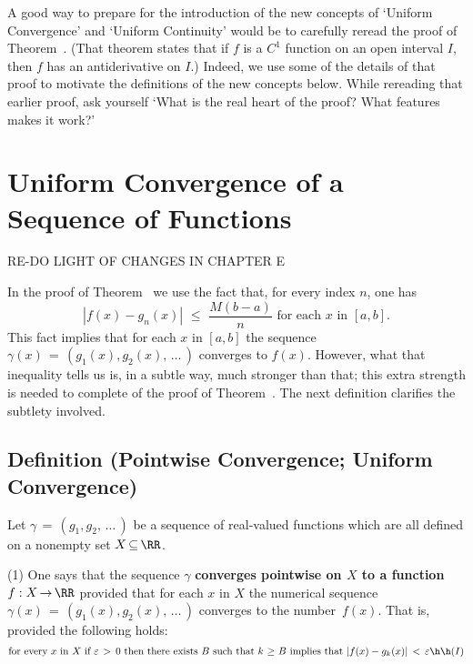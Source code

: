     A good way to prepare for the introduction of the new concepts of `Uniform Convergence' and `Uniform Continuity'
    would be to carefully reread the proof of Theorem~.
    (That theorem states that if $f$ is a $C^{1}$ function on an open interval $I$, then $f$ has an antiderivative on $I$.)
    Indeed, we use some of the details of that proof to motivate the definitions of the new concepts below.
    While rereading that earlier proof, ask yourself `What is the real heart of the proof? What features makes it work?'

\V
\V

                \section{{\bf Uniform Convergence of a Sequence of Functions}}
                \label{SectF05}

\V

RE-DO LIGHT OF CHANGES IN CHAPTER E

        In the proof of Theorem~ we use the fact that, for every index $n$, one has
        \begin{displaymath}
        |f(x)-g_{n}(x)|\,\,{\leq}\,\,\frac{M(b-a)}{n} \mbox{ for each $x$ in $[a,b]$}.
        \end{displaymath}
This fact implies that for each $x$ in $[a,b]$ the sequence ${\gamma}(x) \,=\, (g_{1}(x), g_{2}(x),\,{\ldots}\,)$ converges to $f(x)$.
    However, what that inequality tells us is, in a subtle way, much stronger than that;
    this extra strength is needed to complete of the proof of Theorem~.
    The next definition clarifies the subtlety involved.

\V

            \subsection{\small{\bf Definition} (Pointwise Convergence; Uniform Convergence)}
            \label{DefF05.20}

\V

        Let ${\gamma} \,=\, (g_{1}, g_{2},\,{\ldots}\,)$ be a sequence of real-valued functions which are all defined on a nonempty set $X \,{\subseteq}\, {\RR}$.


        (1) One says that the sequence ${\gamma}$ {\bf converges pointwise on $X$ to a function $f:X \,{\rightarrow}\, {\RR}$}
    provided that for each $x$ in $X$ the numerical sequence ${\gamma}(x) \,=\, (g_{1}(x), g_{2}(x),\,{\ldots}\,)$ converges to the number~$f(x)$.
    That is, provided the following holds:
        \begin{displaymath}
        \mbox{for every $x$ in $X$ if ${\varepsilon}\,>\,0$ then there exists $B$ such that $k\,\,{\geq}\,\,B$ implies that $|f(x)-g_{k}(x)|\,<\,{\varepsilon}$} \h \h (I)
        \end{displaymath}

